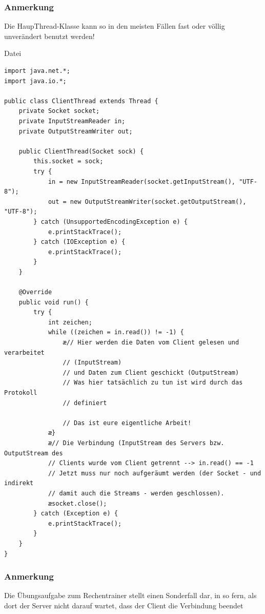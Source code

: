 \subsubsection{Anmerkung}

Die HaupThread-Klasse kann so in den meisten Fällen fast oder völlig
unverändert benutzt werden!

\pagebreak

Datei 

\begin{lstlisting}
import java.net.*;
import java.io.*;

public class ClientThread extends Thread {
    private Socket socket;
    private InputStreamReader in;
	private OutputStreamWriter out;

    public ClientThread(Socket sock) {
        this.socket = sock;
        try {
            in = new InputStreamReader(socket.getInputStream(), "UTF-8");
            out = new OutputStreamWriter(socket.getOutputStream(), "UTF-8");
        } catch (UnsupportedEncodingException e) {
            e.printStackTrace();
        } catch (IOException e) {
            e.printStackTrace();
        }
    }

    @Override
    public void run() {
        try {
            int zeichen;
            while ((zeichen = in.read()) != -1) {
                æ// Hier werden die Daten vom Client gelesen und verarbeitet
                // (InputStream)
                // und Daten zum Client geschickt (OutputStream)
                // Was hier tatsächlich zu tun ist wird durch das Protokoll
                // definiert

                // Das ist eure eigentliche Arbeit!
            æ}
            æ// Die Verbindung (InputStream des Servers bzw. OutputStream des
            // Clients wurde vom Client getrennt --> in.read() == -1
            // Jetzt muss nur noch aufgeräumt werden (der Socket - und indirekt
            // damit auch die Streams - werden geschlossen).
            æsocket.close();
        } catch (Exception e) {
            e.printStackTrace();
        }
    }
}
\end{lstlisting}

\subsubsection{Anmerkung}

Die Übungsaufgabe zum Rechentrainer stellt einen Sonderfall dar, in so fern,
als dort der Server nicht darauf wartet, dass der Client die Verbindung beendet


